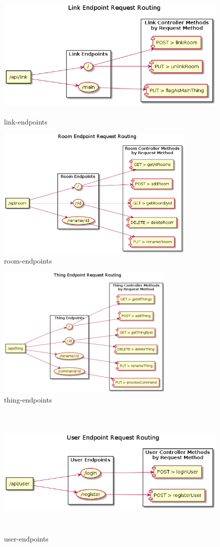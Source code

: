 \begin{figure}[hbt!]
\centering
\includegraphics[height=2.5in]{figures/diagrams/back/router-flow/link-endpoints.png}
\caption[link-endpoints]{link-endpoints\footnotemark}
\end{figure}

\begin{figure}[hbt!]
\centering
\includegraphics[height=2.5in]{figures/diagrams/back/router-flow/room-endpoints.png}
\caption[room-endpoints]{room-endpoints\footnotemark}
\end{figure}

\begin{figure}[hbt!]
\centering
\includegraphics[height=2.5in]{figures/diagrams/back/router-flow/thing-endpoints.png}
\caption[thing-endpoints]{thing-endpoints\footnotemark}
\end{figure}

\begin{figure}[hbt!]
\centering
\includegraphics[height=2.5in]{figures/diagrams/back/router-flow/user-endpoints.png}
\caption[user-endpoints]{user-endpoints\footnotemark}
\end{figure}
